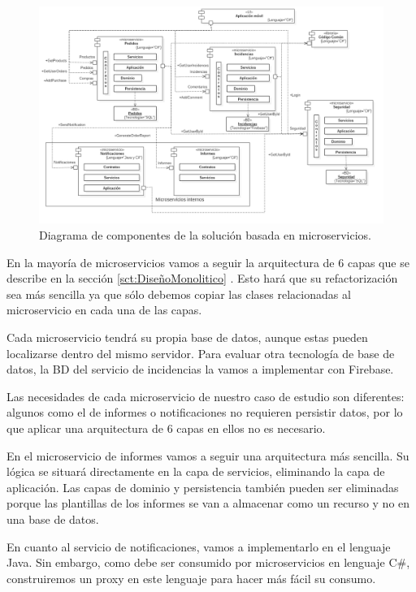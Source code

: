 \documentclass[11pt,spanish,listoffigures]{tfgetsinf}
\begin{document}
\begin{figure}[h]
\centering
\includegraphics[scale=0.35]{Componentes}
\caption{Diagrama de componentes de la solución basada en microservicios.}
\end{figure}

En la mayoría de microservicios vamos a seguir la arquitectura de 6 capas que se describe en la sección \ref{sct:DiseñoMonolitico} . Esto hará que su refactorización sea más sencilla ya que sólo debemos copiar las clases relacionadas al microservicio en cada una de las capas. 

Cada microservicio tendrá su propia base de datos, aunque estas pueden localizarse dentro del mismo servidor. Para evaluar otra tecnología de base de datos, la BD del servicio de incidencias la vamos a implementar con Firebase.

Las necesidades de cada microservicio de nuestro caso de estudio son diferentes: algunos como el de informes o notificaciones no requieren persistir datos, por lo que aplicar una arquitectura de 6 capas en ellos no es necesario. 

En el microservicio de informes vamos a seguir una arquitectura más sencilla. Su lógica se situará directamente en la capa de servicios, eliminando la capa de aplicación. Las capas de dominio y persistencia también pueden ser eliminadas porque las plantillas de los informes se van a almacenar como un recurso y no en una base de datos. 

En cuanto al servicio de notificaciones, vamos a implementarlo en el lenguaje Java. Sin embargo, como debe ser consumido por microservicios en lenguaje C\#, construiremos un proxy en este lenguaje para hacer más fácil su consumo.
\end{document}
